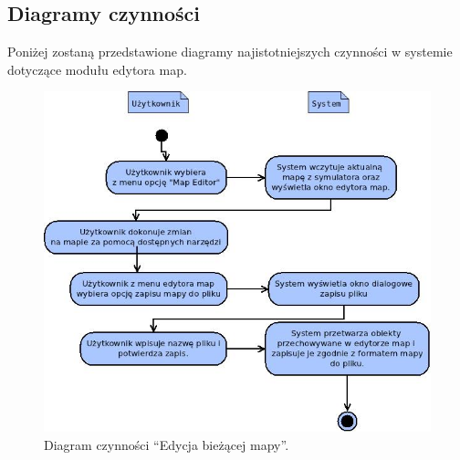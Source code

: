 \subsection{Diagramy czynności}
\begin{par}
		Poniżej zostaną przedstawione diagramy najistotniejszych czynności w systemie dotyczące modułu edytora map.
		\begin{figure}[!h]
		\centering
		\includegraphics[width=\textwidth]{obrazki/czynnosci_edytor_map.jpeg}
		\caption{Diagram czynności ``Edycja bieżącej mapy''.}
		\label{fig:czynn_edytor_map}
		\end{figure}
		\FloatBarrier
\end{par}



